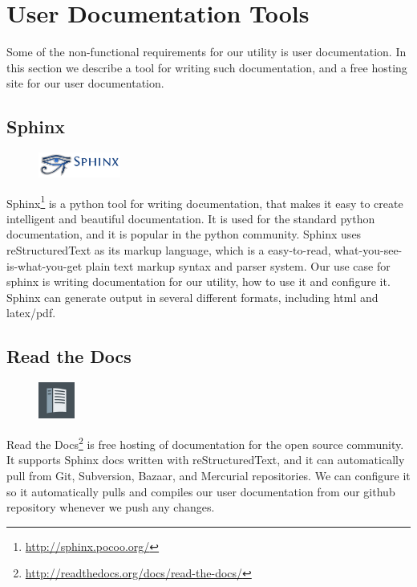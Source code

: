\section{User Documentation Tools}
\label{sec:pre:docs}
Some of the non-functional requirements for our utility is user documentation.
In this section we describe a tool for writing such documentation, and a free
hosting site for our user documentation.

\subsection{Sphinx}
\begin{figure}
	\vspace{-20pt}
	\includegraphics[width=2.7cm]{./planning/img/sphinx_logo}
	\vspace{-20pt}
\end{figure}
Sphinx\footnote{\url{http://sphinx.pocoo.org/}} is a python tool for writing
documentation, that makes it easy to create intelligent and beautiful
documentation. It is used for the standard python documentation, and it is
popular in the python community. Sphinx uses reStructuredText as its markup
language, which is a easy-to-read, what-you-see-is-what-you-get plain text
markup syntax and parser system. Our use case for sphinx is writing
documentation for our utility, how to use it and configure it. Sphinx can
generate output in several different formats, including html and latex/pdf.

\subsection{Read the Docs}
\begin{figure}
	\vspace{-20pt}
	\includegraphics[width=1.2cm]{./planning/img/readthedocs_logo}
	\vspace{-20pt}
\end{figure}
Read the Docs\footnote{\url{http://readthedocs.org/docs/read-the-docs/}} is
free hosting of documentation for the open source community. It supports Sphinx
docs written with reStructuredText, and it can automatically pull from Git,
Subversion, Bazaar, and Mercurial repositories. We can configure it so it
automatically pulls and compiles our user documentation from our github
repository whenever we push any changes.


